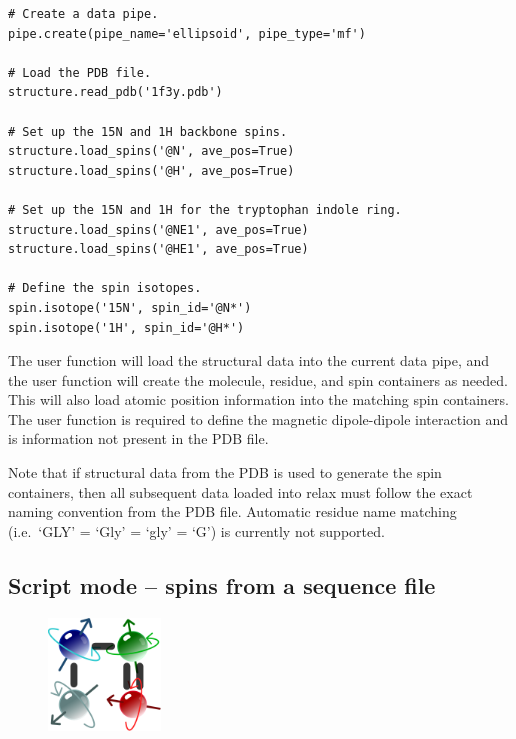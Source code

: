 \begin{lstlisting}
# Create a data pipe.
pipe.create(pipe_name='ellipsoid', pipe_type='mf')

# Load the PDB file.
structure.read_pdb('1f3y.pdb')

# Set up the 15N and 1H backbone spins.
structure.load_spins('@N', ave_pos=True)
structure.load_spins('@H', ave_pos=True)

# Set up the 15N and 1H for the tryptophan indole ring.
structure.load_spins('@NE1', ave_pos=True)
structure.load_spins('@HE1', ave_pos=True)

# Define the spin isotopes.
spin.isotope('15N', spin_id='@N*')
spin.isotope('1H', spin_id='@H*')
\end{lstlisting}

The  user function will load the structural data into the current data pipe, and the  user function will create the molecule, residue, and spin containers as needed.
This will also load atomic position information into the matching spin containers.
The  user function is required to define the magnetic dipole-dipole interaction and is information not present in the PDB file.

Note that if structural data from the PDB is used to generate the spin containers, then all subsequent data loaded into relax must follow the exact naming convention from the PDB file.
Automatic residue name matching (i.e.\ `GLY' = `Gly' = `gly' = `G') is currently not supported.




\subsection{Script mode -- spins from a sequence file} \label{sect: script - sequence file}

\begin{figure}[h]
  \includegraphics[width=3cm, bb=0 0 1701 1701]{graphics/misc/sequence_600x600}
\end{figure}

